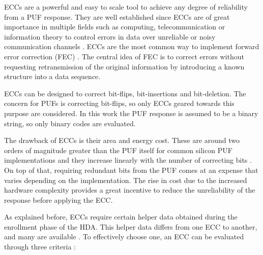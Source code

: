 ECCs are a powerful and easy to scale tool to achieve any degree of reliability from a PUF response. They are well established since ECCs are of great importance in multiple fields such as computing, telecommunication or information theory to control errors in data over unreliable or noisy communication channels \cite{CastineiraMoreira2006}. ECCs are the most common way to implement forward error correction (FEC) \cite{CastineiraMoreira2006}. The central idea of FEC is to correct errors without requesting retransmission of the original information by introducing a known structure into a data sequence.

ECCs can be designed to correct bit-flips, bit-insertions and bit-deletion. The concern for PUFs is correcting bit-flips, so only ECCs geared towards this purpose are considered. In this work the PUF response is assumed to be a binary string, so only binary codes are evaluated.

The drawback of ECCs is their area and energy cost. These are around two orders of magnitude greater than the PUF itself \cite{Alioto2019} for common silicon PUF implementations and they increase linearly with the number of correcting bits \cite{Taneja2019}. On top of that, requiring redundant bits from the PUF comes at an expense that varies depending on the implementation. The rise in cost due to the increased hardware complexity provides a great incentive to reduce the unreliability of the response before applying the ECC.


As explained before, ECCs require certain helper data obtained during the enrollment phase of the HDA. This helper data differs from one ECC to another, and many are available \cite{CastineiraMoreira2006}. To effectively choose one, an ECC can be evaluated through three criteria \cite{Xu2015}:

